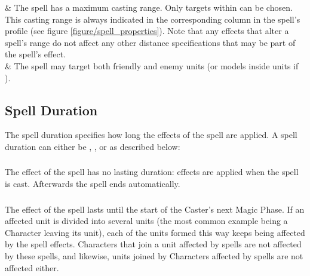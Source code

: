 \begin{tableterrain}
\textbf{} & The spell has a maximum casting range. Only targets within  can be chosen. This casting range is always indicated in the corresponding column in the spell's profile (see figure \ref{figure/spell_properties}). Note that any effects that alter a spell's range do not affect any other distance specifications that may be part of the spell's effect.\\

\textbf{\universal} & The spell may target both friendly and enemy units (or models inside units if \focused{}).\\
\end{tableterrain}

\subsection{Spell Duration}

The spell duration specifies how long the effects of the spell are applied. A spell duration can either be \instant{}, \oneturn{}, or \permanent{} as described below:

\subsubsection{\instant}

The effect of the spell has no lasting duration: effects are applied when the spell is cast. Afterwards the spell ends automatically.

\subsubsection{\oneturn}
\idx[main=y]{\oneturn{}}\label{one_turn}

The effect of the spell lasts until the start of the Caster's next Magic Phase. If an affected unit is divided into several units (the most common example being a Character leaving its unit), each of the units formed this way keeps being affected by the spell effects. Characters that join a unit affected by \oneturn{} spells are not affected by these spells, and likewise, units joined by Characters affected by \oneturn{} spells are not affected either.

\subsubsection{\permanent}

